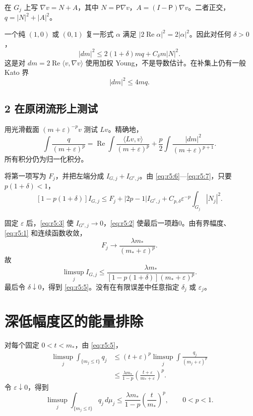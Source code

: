 \documentclass[UTF8,11pt,openany,oneside,fontset=none]{ctexbook}
\begin{document}
在 \(G_j\) 上写 \(\nabla v=N+A\)，其中 \(N=\mathsf P\nabla v\)，\(A=(I-\mathsf P)\nabla v\)。二者正交，\(q=|N|^2+|A|^2\)。

一个纯 \((1,0)\) 或 \((0,1)\) 复一形式 \(\alpha\) 满足 \(|2\operatorname{Re}\alpha|^2=2|\alpha|^2\)。因此对任何 \(\delta>0\)， \[
 |dm|^2
 \le 2(1+\delta)m q+C_\delta m|N|^2.
\tag{5.6}\label{eq:r5:6}
\] 这是对 \(dm=2\operatorname{Re}\langle v,\nabla v\rangle\) 使用加权 Young，不是导数估计。在补集上仍有一般 Kato 界 \[
 |dm|^2\le4mq.
\tag{5.7}\label{eq:r5:7}
\]

\subsection{2 在原闭流形上测试}\label{ch5:ux5728ux539fux95edux6d41ux5f62ux4e0aux6d4bux8bd5}

用光滑截面 \((m+\varepsilon)^{-p}v\) 测试 \(Lv\)。精确地， \[
 \int\frac q{(m+\varepsilon)^p}
 =\operatorname{Re}\int\frac{\langle Lv,v\rangle}{(m+\varepsilon)^p}
 +\frac p2\int\frac{|dm|^2}{(m+\varepsilon)^{p+1}}.
\tag{5.8}\label{eq:r5:8}
\] 所有积分仍为归一化积分。

将第一项写为 \(F_j\)，并把左端分成 \(I_{G,j}+I_{G^c,j}\)。由 \eqref{eq:r5:6}---\eqref{eq:r5:7}，只要 \(p(1+\delta)<1\)， \[
 [1-p(1+\delta)]I_{G,j}
 \le F_j+|2p-1|I_{G^c,j}
   +C_{p,\delta}\varepsilon^{-p}\int_{G_j}|N_j|^2.
\tag{5.9}\label{eq:r5:9}
\]

固定 \(\varepsilon\) 后，\eqref{eq:r5:3} 使 \(I_{G^c,j}\to0\)，\eqref{eq:r5:2} 使最后一项趋0。由有界幅度、\eqref{eq:r5:1} 和连续函数收敛， \[
 F_j\longrightarrow\frac{\lambda m_*}{(m_*+\varepsilon)^p}.
\] 故 \[
 \limsup_j I_{G,j}\le
 \frac{\lambda m_*}
 {[1-p(1+\delta)](m_*+\varepsilon)^p}.
\] 最后令 \(\delta\downarrow0\)，得到 \eqref{eq:r5:5}。没有在有限误差中任意指定 \(\delta_j\) 或 \(\varepsilon_j\)。

\section{深低幅度区的能量排除}\label{ch5:ux6df1ux4f4eux5e45ux5ea6ux533aux7684ux80fdux91cfux6392ux9664}

对每个固定 \(0<t<m_*\)，由 \eqref{eq:r5:5}， \[
 \begin{aligned}
 \limsup_j\int_{\{m_j\le t\}}q_j
 &\le (t+\varepsilon)^p
       \limsup_j\int\frac{q_j}{(m_j+\varepsilon)^p}\\
 &\le\frac{\lambda m_*}{1-p}
       \left(\frac{t+\varepsilon}{m_*+\varepsilon}\right)^p.
 \end{aligned}
\] 令 \(\varepsilon\downarrow0\)，得到 \[
 \boxed{
 \limsup_j\int_{\{m_j\le t\}}q_j\,d\mu_j
 \le\frac{\lambda m_*}{1-p}\left(\frac t{m_*}\right)^p,
 \qquad 0<p<1.
 }
\tag{5.10}\label{eq:r5:10}
\]
\end{document}
